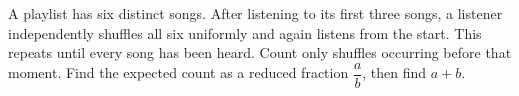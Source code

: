 A playlist has six distinct songs. After listening to its first three songs, a listener independently shuffles all six uniformly and again listens from the start. This repeats until every song has been heard. Count only shuffles occurring before that moment. Find the expected count as a reduced fraction $\dfrac{a}{b}$, then find $a+b$.
